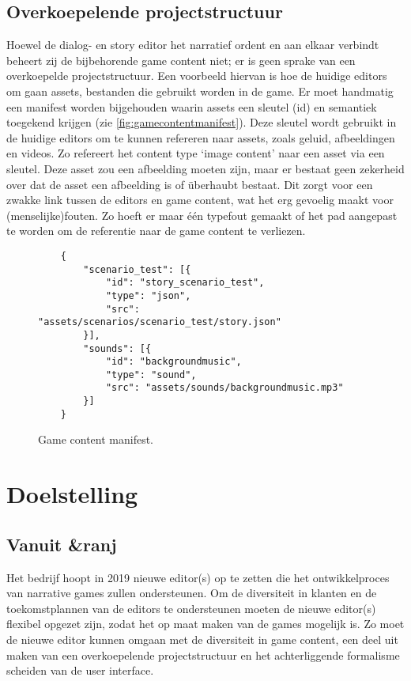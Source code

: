 \subsection{Overkoepelende projectstructuur}
Hoewel de dialog- en story editor het narratief ordent en aan elkaar verbindt beheert zij de bijbehorende game content niet; er is geen sprake van een overkoepelde projectstructuur. Een voorbeeld hiervan is hoe de huidige editors om gaan assets, bestanden die gebruikt worden in de game. Er moet handmatig een manifest worden bijgehouden waarin assets een sleutel (id) en semantiek toegekend krijgen (zie \autoref{fig:gamecontentmanifest}). Deze sleutel wordt gebruikt in de huidige editors om te kunnen refereren naar assets, zoals geluid, afbeeldingen en videos. Zo refereert het content type ‘image content’ naar een asset via een sleutel. Deze asset zou een afbeelding moeten zijn, maar er bestaat geen zekerheid over dat de asset een afbeelding is of überhaubt bestaat. Dit zorgt voor een zwakke link tussen de editors en game content, wat het erg gevoelig maakt voor (menselijke)fouten. Zo hoeft er maar één typefout gemaakt of het pad aangepast te worden om de referentie naar de game content te verliezen.

\begin{figure}[htb]
    \centering
    \lstset{language=JSON}
    \begin{lstlisting}
    {
        "scenario_test": [{
            "id": "story_scenario_test",
            "type": "json",
            "src": "assets/scenarios/scenario_test/story.json"
        }],
        "sounds": [{
            "id": "backgroundmusic",
            "type": "sound",
            "src": "assets/sounds/backgroundmusic.mp3"
        }]
    }
    \end{lstlisting}
    \caption{Game content manifest.}
    \label{fig:gamecontentmanifest}
\end{figure}

\pagebreak
\section{Doelstelling}
\subsection{Vanuit \&ranj}
Het bedrijf hoopt in 2019 nieuwe editor(s) op te zetten die het ontwikkelproces van narrative games zullen ondersteunen. Om de diversiteit in klanten en de toekomstplannen van de editors te ondersteunen moeten de nieuwe editor(s) flexibel opgezet zijn, zodat het op maat maken van de games mogelijk is. Zo moet de nieuwe editor kunnen omgaan met de diversiteit in game content, een deel uit maken van een overkoepelende projectstructuur en het achterliggende formalisme scheiden van de user interface.

